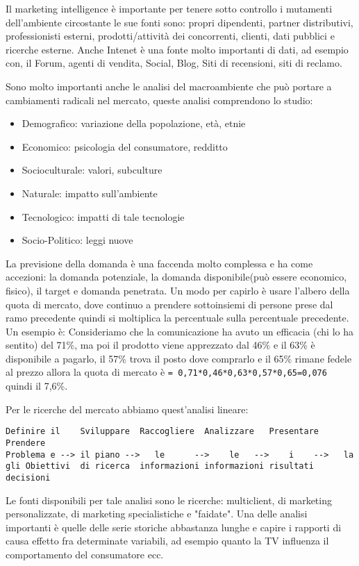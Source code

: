 \documentclass[11pt]{article}
\newenvironment{nosepitemize}{\begin{itemize}[noitemsep,topsep=0ex]}{\end{itemize}}
\begin{document}
Il marketing intelligence è importante per tenere sotto controllo i mutamenti dell'ambiente circostante le sue fonti sono: propri dipendenti, partner distributivi, professionisti esterni, prodotti/attività dei concorrenti, clienti, dati pubblici e ricerche esterne. Anche Intenet è una fonte molto importanti di dati, ad esempio con, il Forum, agenti di vendita, Social, Blog, Siti di recensioni, siti di reclamo.

Sono molto importanti anche le analisi del macroambiente che può portare a cambiamenti radicali nel mercato, queste analisi comprendono lo studio: 
\begin{nosepitemize}
	\item Demografico: variazione della popolazione, età, etnie
	\item Economico: psicologia del consumatore, redditto
	\item Socioculturale: valori, subculture
	\item Naturale: impatto sull'ambiente
	\item Tecnologico: impatti di tale tecnologie
	\item Socio-Politico: leggi nuove
\end{nosepitemize}

La previsione della domanda è una faccenda molto complessa e ha come accezioni: la domanda potenziale, la domanda disponibile(può essere economico, fisico), il target e domanda penetrata. Un modo per capirlo è usare l'albero della quota di mercato, dove continuo a prendere sottoinsiemi di persone prese dal ramo precedente quindi si moltiplica la percentuale sulla percentuale precedente. 
Un esempio è: Consideriamo che la comunicazione ha avuto un efficacia (chi lo ha sentito) del 71\%, ma poi il prodotto viene apprezzato dal 46\% e il 63\% è disponibile a pagarlo, il 57\% trova il posto dove comprarlo e il 65\% rimane fedele al prezzo allora la quota di mercato è \verb|= 0,71*0,46*0,63*0,57*0,65=0,076| quindi il 7,6\%.

Per le ricerche del mercato abbiamo quest'analisi lineare:
\begin{verbatim}
Definire il    Sviluppare  Raccogliere  Analizzare   Presentare  Prendere
Problema e --> il piano -->   le      -->    le   -->    i    -->   la
gli Obiettivi  di ricerca  informazioni informazioni risultati   decisioni
\end{verbatim}
Le fonti disponibili per tale analisi sono le ricerche: multiclient, di marketing personalizzate, di marketing specialistiche e "faidate".
Una delle analisi importanti è quelle delle serie storiche abbastanza lunghe e capire i rapporti di causa effetto fra determinate variabili, ad esempio quanto la TV influenza il comportamento del consumatore ecc.
\end{document}
